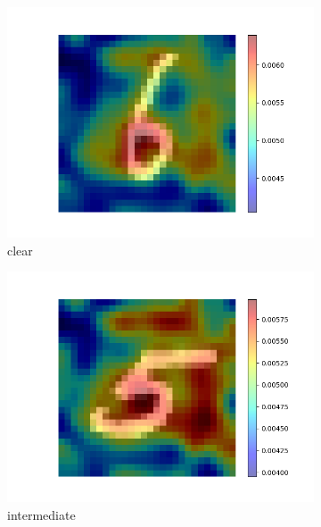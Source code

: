 \documentclass[a4paper]{scrartcl}
\begin{document}
\begin{figure}[btp]
        \begin{subfigure}[t]{0.3\textwidth}
            \centering
            \includegraphics[width=\textwidth]{img/plots/attention_visualization_good_2}
            \caption{clear}
        \end{subfigure}
        \hfill
        \begin{subfigure}[t]{0.3\textwidth}
            \centering
            \includegraphics[width=\textwidth]{img/plots/attention_visualization_middle_2}
            \caption{intermediate}
        \end{subfigure}
        \hfill
        \begin{subfigure}[t]{0.3\textwidth}
            \centering

\end{subfigure}
\end{figure}
\end{document}
